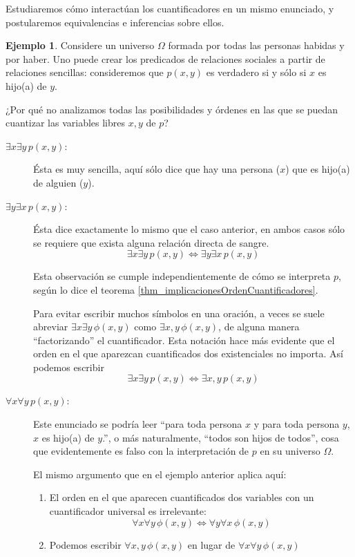 \documentclass{book}
\theoremstyle{definition}
\newtheorem{ejm}{Ejemplo}[chapter]
\begin{document}
Estudiaremos cómo interactúan los cuantificadores en un mismo enunciado, y postularemos equivalencias e inferencias sobre ellos.

\begin{ejm}\label{ej_relaciónPadre}
	Considere un universo $\Omega$ formada por todas las personas habidas y por haber. Uno puede crear los predicados de relaciones sociales a partir de relaciones sencillas:
	consideremos que $p(x,y)$ es verdadero si y sólo si $x$ es hijo(a) de $y$.
	
	¿Por qué no analizamos todas las posibilidades y órdenes en las que se puedan cuantizar las variables libres $x,y$ de $p$?
	
	\begin{description}
		\item[$\exists x \exists y\, p(x,y)$:] Ésta es muy sencilla, aquí sólo dice que hay una persona ($x$) que es hijo(a) de alguien ($y$).
		\item[$\exists y \exists x\, p(x,y)$:] Ésta dice exactamente lo mismo que el caso anterior, en ambos casos sólo se requiere que exista alguna relación directa de sangre.
		\[\exists x \exists y\, p(x,y)\iff\exists y \exists x\, p(x,y) \]
		
		Esta observación se cumple independientemente de cómo se interpreta $p$, según lo dice el teorema \ref{thm_implicacionesOrdenCuantificadores}.
		
		Para evitar escribir muchos símbolos en una oración, a veces se suele abreviar $\exists x \exists y\, \phi(x,y)$ como $\exists x,y\, \phi(x,y)$, de alguna manera ``factorizando'' el cuantificador.
		Esta notación hace más evidente que el orden en el que aparezcan cuantificados dos existenciales no importa.
		Así podemos escribir
			\[\exists x \exists y\, p(x,y)\iff\exists x,y\, p(x,y) \]
			
	\item[$\forall x \forall y\, p(x,y)$:] Este enunciado se podría leer	``para toda persona $x$ y para toda persona $y$, $x$ es hijo(a) de $y$.'', o más naturalmente, ``todos son hijos de todos'', cosa que evidentemente es falso con la interpretación de $p$ en su universo $\Omega$.
	
	El mismo argumento que en el ejemplo anterior aplica aquí: 
	\begin{enumerate}
		\item El orden en el que aparecen cuantificados dos variables con un cuantificador universal es irrelevante:
		\[\forall x \forall y\, \phi(x,y) \iff \forall y \forall x\, \phi(x,y) \]
		\item Podemos escribir $\forall x,y\, \phi(x,y)$ en lugar de $\forall x \forall y\, \phi(x,y)$
	\end{enumerate}
	

\end{description}
\end{ejm}
\end{document}
